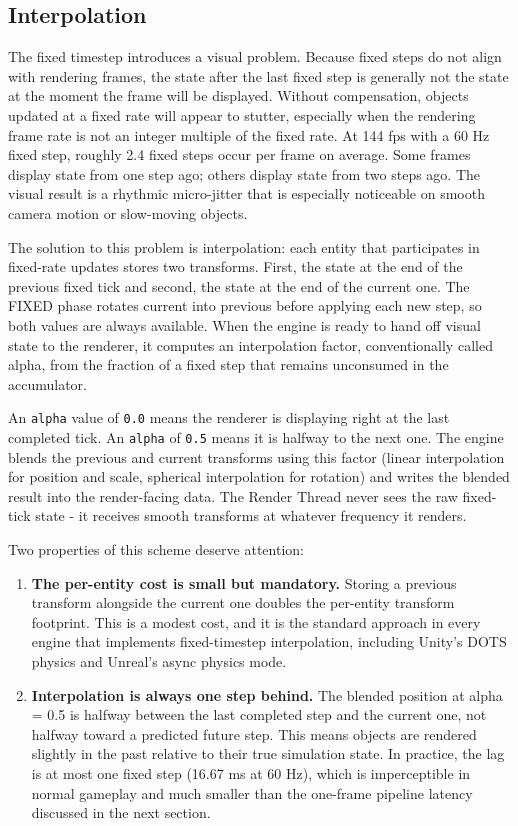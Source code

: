 \documentclass[
  11pt,
  letterpaper,
  DIV=11,
  numbers=noendperiod,
  twoside,
  open=right]{scrreprt}
\begin{document}
\subsection{Interpolation}\label{interpolation}

The fixed timestep introduces a visual problem. Because fixed steps do
not align with rendering frames, the state after the last fixed step is
generally not the state at the moment the frame will be displayed.
Without compensation, objects updated at a fixed rate will appear to
stutter, especially when the rendering frame rate is not an integer
multiple of the fixed rate. At 144 fps with a 60 Hz fixed step, roughly
2.4 fixed steps occur per frame on average. Some frames display state
from one step ago; others display state from two steps ago. The visual
result is a rhythmic micro-jitter that is especially noticeable on
smooth camera motion or slow-moving objects.

The solution to this problem is interpolation: each entity that
participates in fixed-rate updates stores two transforms. First, the
state at the end of the previous fixed tick and second, the state at the
end of the current one. The FIXED phase rotates current into previous
before applying each new step, so both values are always available. When
the engine is ready to hand off visual state to the renderer, it
computes an interpolation factor, conventionally called alpha, from the
fraction of a fixed step that remains unconsumed in the accumulator.

An \texttt{alpha} value of \texttt{0.0} means the renderer is displaying
right at the last completed tick. An \texttt{alpha} of \texttt{0.5}
means it is halfway to the next one. The engine blends the previous and
current transforms using this factor (linear interpolation for position
and scale, spherical interpolation for rotation) and writes the blended
result into the render-facing data. The Render Thread never sees the raw
fixed-tick state - it receives smooth transforms at whatever frequency
it renders.

Two properties of this scheme deserve attention:

\begin{enumerate}
\def\labelenumi{\arabic{enumi}.}
\item
  \textbf{The per-entity cost is small but mandatory.} Storing a
  previous transform alongside the current one doubles the per-entity
  transform footprint. This is a modest cost, and it is the standard
  approach in every engine that implements fixed-timestep interpolation,
  including Unity's DOTS physics and Unreal's async physics mode.
\item
  \textbf{Interpolation is always one step behind.} The blended position
  at alpha = 0.5 is halfway between the last completed step and the
  current one, not halfway toward a predicted future step. This means
  objects are rendered slightly in the past relative to their true
  simulation state. In practice, the lag is at most one fixed step
  (16.67 ms at 60 Hz), which is imperceptible in normal gameplay and
  much smaller than the one-frame pipeline latency discussed in the next
  section.
\end{enumerate}
\end{document}
